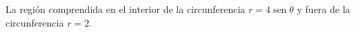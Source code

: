 \item La región comprendida en el interior de la circunferencia $r = 4 \operatorname{sen} \theta$ y fuera de la circunferencia $r = 2$.
